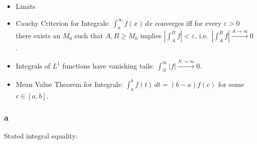\begin{solution}

\hfill

\begin{concept}

\hfill

\begin{itemize}
\tightlist
\item
  Limits
\item
  Cauchy Criterion for Integrals: \(\int_a^\infty f(x) \,dx\) converges
  iff for every \(\varepsilon>0\) there exists an \(M_0\) such that
  \(A,B\geq M_0\) implies
  \({\left\lvert {\int_A^B f} \right\rvert} < \varepsilon\),
  i.e.~\({\left\lvert {\int_A^B f} \right\rvert} \overset{A\to\infty}\to 0\).
\item
  Integrals of \(L^1\) functions have vanishing tails:
  \(\int_{N}^\infty {\left\lvert {f} \right\rvert} \overset{N\to\infty}\to 0\).
\item
  Mean Value Theorem for Integrals: \(\int_a^b f(t)\, dt = (b-a) f(c)\)
  for some \(c\in [a, b]\).
\end{itemize}

\end{concept}

\hypertarget{a-8}{%
\subsubsection{a}\label{a-8}}

Stated integral equality:


\end{solution}

